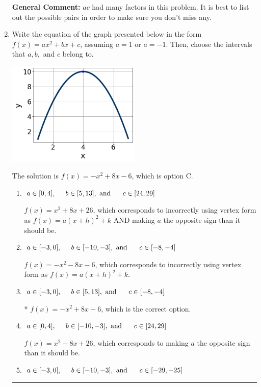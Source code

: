 \documentclass{extbook}[14pt]
\newcommand{\litem}[1]{\item #1

\rule{\textwidth}{0.4pt}}
\begin{document}
\begin{enumerate}
{\textbf{General Comment:} $ac$ had many factors in this problem. It is best to list out the possible pairs in order to make sure you don't miss any.
}
\litem{
Write the equation of the graph presented below in the form $f(x)=ax^2+bx+c$, assuming  $a=1$ or $a=-1$. Then, choose the intervals that $a, b,$ and $c$ belong to.

\begin{center}
    \includegraphics[width=0.5\textwidth]{../Figures/quadraticGraphToEquationCopyA.png}
\end{center}


The solution is \( f(x) = -x^{2} +8 x -6 \), which is option C.\begin{enumerate}[label=\Alph*.]
\item \( a \in [0, 4], \hspace*{5mm} b \in [5, 13], \text{ and } \hspace*{5mm} c \in [24, 29] \)

$f(x)=x^{2} +8 x + 26$, which corresponds to incorrectly using vertex form as $f(x) = a(x+h)^2+k$ AND making $a$ the opposite sign than it should be.
\item \( a \in [-3, 0], \hspace*{5mm} b \in [-10, -3], \text{ and } \hspace*{5mm} c \in [-8, -4] \)

$f(x)=-x^{2} -8 x -6$, which corresponds to incorrectly using vertex form as $f(x) = a(x+h)^2+k$.
\item \( a \in [-3, 0], \hspace*{5mm} b \in [5, 13], \text{ and } \hspace*{5mm} c \in [-8, -4] \)

* $f(x)=-x^{2} +8 x -6$, which is the correct option.
\item \( a \in [0, 4], \hspace*{5mm} b \in [-10, -3], \text{ and } \hspace*{5mm} c \in [24, 29] \)

$f(x)=x^{2} -8 x + 26$, which corresponds to making $a$ the opposite sign than it should be.
\item \( a \in [-3, 0], \hspace*{5mm} b \in [-10, -3], \text{ and } \hspace*{5mm} c \in [-29, -25] \)


\end{enumerate}}
\end{enumerate}
\end{document}
